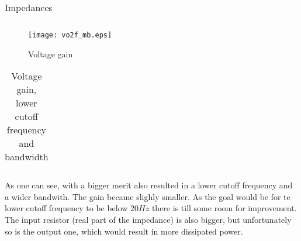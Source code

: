 \begin{table}[H]
  \centering
  \begin{tabular}{|c|c|}
    \hline
        
        \hline
  \end{tabular}
  \caption{Impedances}
  \label{tab:sim_imp_mb}
\end{table}

\begin{figure}[H]
\centering
\texttt{[image: vo2f\_mb.eps]}
\caption{Voltage gain}
\label{vg_mb}
\end{figure}

\begin{table}[H]
  \centering
  \begin{tabular}{|c|c|}
    \hline
        
        \hline
  \end{tabular}
  \caption{Voltage gain, lower cutoff frequency and bandwidth}
  \label{tab:res_sim_mb}
\end{table}

As one can see, with a bigger merit also resulted in a lower cutoff frequency and a wider bandwith. The gain became slighly smaller. As the goal would be for te lower cutoff frequency to be below $20Hz$ there is till some room for improvement. The input resistor (real part of the impedance) is also bigger, but unfortunately so is the output one, which would result in more dissipated power.
